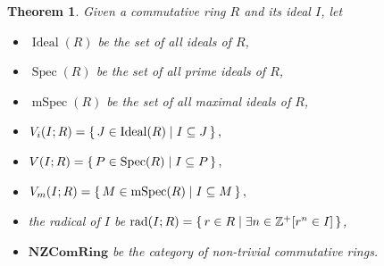 \documentclass[12pt, letterpaper]{article}
\newcommand{\inte}{\mathbb{Z}}
\newtheorem{thm}[prop]{Theorem}
\theoremstyle{definition}
\theoremstyle{remark}
\theoremstyle{definition}
\theoremstyle{plain}
\numberwithin{equation}{section}
\begin{document}
	\begin{thm}
		Given a commutative ring $R$ and its ideal $I$, let
		\begin{itemize}
			\item $\operatorname{Ideal}(R)$ be the set of all ideals of $R$,
			\item $\operatorname{Spec}(R)$  be the set of all prime ideals of $R$,
			\item $\operatorname{mSpec}(R)$ be the set of all maximal ideals of $R$,
			\item $V_i(I;R) = \set{J\in \operatorname{Ideal}(R)|I\subseteq J}, $
			\item $V(I;R) = \set{P\in \operatorname{Spec}(R)|I\subseteq P}, $
			\item $V_m(I;R) = \set{M\in \operatorname{mSpec}(R)|I\subseteq M}, $
			\item the radical of $I$ be $\operatorname{rad}(I;R)=\set{r\in R| \exists n\in\inte^+ [r^n\in I]}$,
			\item $\mathbf{NZComRing}$ be the category of non-trivial commutative rings.
		\end{itemize}
		

\end{thm}
\end{document}
